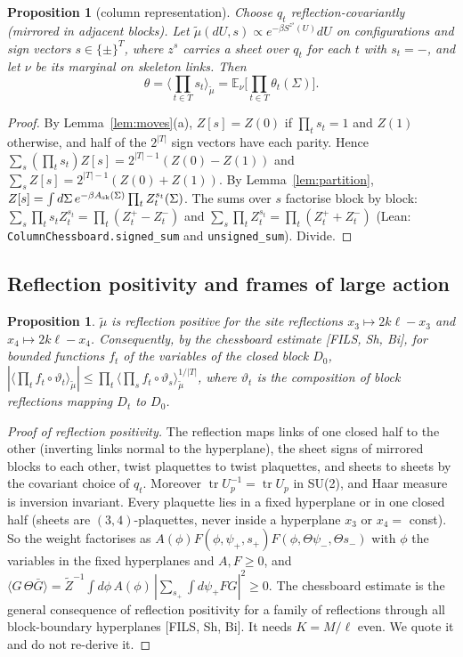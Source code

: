 \documentclass[11pt,a4paper]{article}
\newtheorem{proposition}[lemma]{Proposition}
\theoremstyle{definition}
\theoremstyle{remark}
\newcommand{\E}{\mathbb{E}}
\newcommand{\tr}{\operatorname{tr}}
\newcommand{\code}[1]{\texttt{#1}}
\begin{document}
\begin{proposition}[column representation]\label{prop:column}
Choose $q_t$ reflection-covariantly (mirrored in adjacent blocks). Let $\tilde\mu(dU,s)\propto e^{-\beta S^{z^s}(U)}dU$ on configurations and sign vectors $s\in\{\pm\}^T$, where $z^s$ carries a sheet over $q_t$ for each $t$ with $s_t=-$, and let $\nu$ be its marginal on skeleton links. Then
\[ \theta=\Big\langle\prod_{t\in T}s_t\Big\rangle_{\tilde\mu}=\E_\nu\Big[\prod_{t\in T}\theta_t(\Sigma)\Big]. \]
\end{proposition}
\begin{proof}
By Lemma~\ref{lem:moves}(a), $Z[s]=Z(0)$ if $\prod_ts_t=1$ and $Z(1)$ otherwise, and half of the $2^{|T|}$ sign vectors have each parity.
Hence $\sum_s(\prod_t s_t)Z[s]=2^{|T|-1}(Z(0)-Z(1))$ and $\sum_sZ[s]=2^{|T|-1}(Z(0)+Z(1))$.
By Lemma~\ref{lem:partition}, $Z[s]=\int d\Sigma\,e^{-\beta A_{\rm sk}(\Sigma)}\prod_tZ_t^{s_t}(\Sigma)$.
The sums over $s$ factorise block by block: $\sum_s\prod_ts_tZ^{s_t}_t=\prod_t(Z^+_t-Z^-_t)$ and $\sum_s\prod_tZ^{s_t}_t=\prod_t(Z^+_t+Z^-_t)$ (Lean: \code{ColumnChessboard.signed\_sum} and \code{unsigned\_sum}). Divide.
\end{proof}

\subsection{Reflection positivity and frames of large action}

\begin{proposition}\label{prop:rp}
$\tilde\mu$ is reflection positive for the site reflections $x_3\mapsto2k\ell-x_3$ and $x_4\mapsto2k\ell-x_4$. Consequently, by the chessboard estimate [FILS, Sh, Bi], for bounded functions $f_t$ of the variables of the closed block $D_0$, $|\langle\prod_tf_t\circ\vartheta_t\rangle_{\tilde\mu}|\le\prod_t\langle\prod_sf_t\circ\vartheta_s\rangle_{\tilde\mu}^{1/|T|}$, where $\vartheta_t$ is the composition of block reflections mapping $D_t$ to $D_0$.
\end{proposition}
\begin{proof}[Proof of reflection positivity]
The reflection maps links of one closed half to the other (inverting links normal to the hyperplane), the sheet signs of mirrored blocks to each other, twist plaquettes to twist plaquettes, and sheets to sheets by the covariant choice of $q_t$.
Moreover $\tr U_p^{-1}=\tr U_p$ in SU(2), and Haar measure is inversion invariant.
Every plaquette lies in a fixed hyperplane or in one closed half (sheets are $(3,4)$-plaquettes, never inside a hyperplane $x_3$ or $x_4=$ const).
So the weight factorises as $A(\phi)F(\phi,\psi_+,s_+)F(\phi,\Theta\psi_-,\Theta s_-)$ with $\phi$ the variables in the fixed hyperplanes and $A,F\ge0$, and $\langle G\,\Theta\bar G\rangle=\tilde Z^{-1}\int d\phi\,A(\phi)\,|\sum_{s_+}\int d\psi_+FG|^2\ge0$.
The chessboard estimate is the general consequence of reflection positivity for a family of reflections through all block-boundary hyperplanes [FILS, Sh, Bi].
It needs $K=M/\ell$ even. We quote it and do not re-derive it.
\end{proof}
\end{document}

